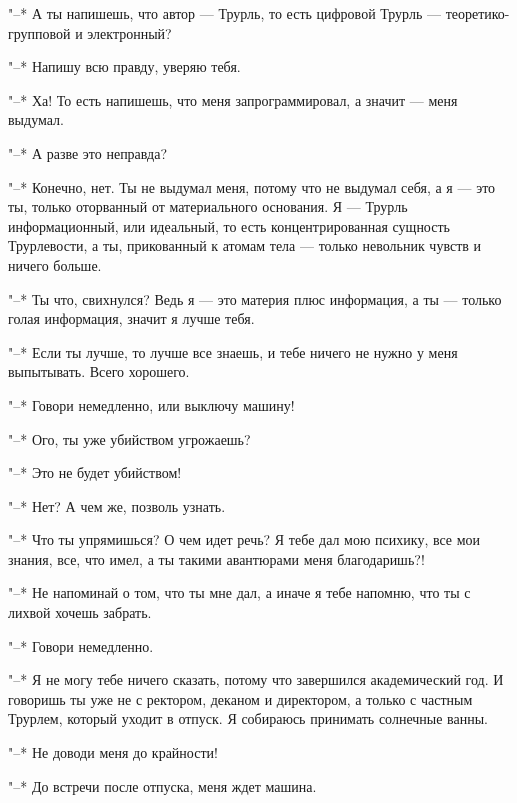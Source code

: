 "--* А ты напишешь, что автор --- Трурль, то есть цифровой
Трурль --- теоретико-групповой и электронный?

"--* Напишу всю правду, уверяю тебя.

"--* Ха! То есть напишешь, что меня запрограммировал, а
значит --- меня выдумал.

"--* А разве это неправда?

"--* Конечно, нет. Ты не выдумал меня, потому что не
выдумал себя, а я --- это ты, только оторванный от
материального основания. Я --- Трурль информационный, или
идеальный, то есть концентрированная сущность Трурлевости, а
ты, прикованный к атомам тела --- только невольник чувств и
ничего больше.

"--* Ты что, свихнулся? Ведь я --- это материя плюс
информация, а ты --- только голая информация, значит я лучше
тебя.

"--* Если ты лучше, то лучше все знаешь, и тебе ничего не
нужно у меня выпытывать. Всего хорошего.

"--* Говори немедленно, или выключу машину!

"--* Ого, ты уже убийством угрожаешь?

"--* Это не будет убийством!

"--* Нет? А чем же, позволь узнать.

"--* Что ты упрямишься? О чем идет речь? Я тебе дал мою
психику, все мои знания, все, что имел, а ты такими
авантюрами меня благодаришь?!

"--* Не напоминай о том, что ты мне дал, а иначе я тебе
напомню, что ты с лихвой хочешь забрать.

"--* Говори немедленно.

"--* Я не могу тебе ничего сказать, потому что завершился
академический год. И говоришь ты уже не с ректором, деканом
и директором, а только с частным Трурлем, который уходит в
отпуск. Я собираюсь принимать солнечные ванны.

"--* Не доводи меня до крайности!

"--* До встречи после отпуска, меня ждет машина.

